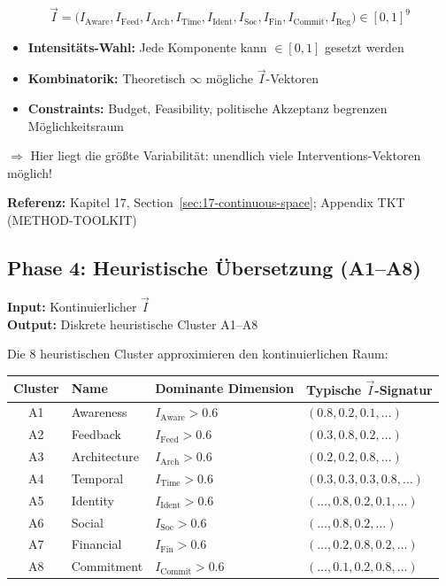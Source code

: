 \begin{equation}
\vec{I} = \bigl(I_{\text{Aware}}, I_{\text{Feed}}, I_{\text{Arch}}, I_{\text{Time}}, I_{\text{Ident}}, I_{\text{Soc}}, I_{\text{Fin}}, I_{\text{Commit}}, I_{\text{Reg}}\bigr) \in [0,1]^9
\end{equation}

\begin{tcolorbox}[colback=orange!5!white, colframe=orange!75!black,
    title=\textbf{Variabilität in Phase 3}]
\begin{itemize}[nosep]
\item \textbf{Intensitäts-Wahl:} Jede Komponente kann $\in [0,1]$ gesetzt werden
\item \textbf{Kombinatorik:} Theoretisch $\infty$ mögliche $\vec{I}$-Vektoren
\item \textbf{Constraints:} Budget, Feasibility, politische Akzeptanz begrenzen Möglichkeitsraum
\end{itemize}
$\Rightarrow$ Hier liegt die größte Variabilität: unendlich viele Interventions-Vektoren möglich!
\end{tcolorbox}

\textbf{Referenz:} Kapitel 17, Section~\ref{sec:17-continuous-space}; Appendix TKT (METHOD-TOOLKIT)

\subsection{Phase 4: Heuristische Übersetzung (A1--A8)}
\label{sec:20-phase4}

\textbf{Input:} Kontinuierlicher $\vec{I}$\\
\textbf{Output:} Diskrete heuristische Cluster A1--A8

Die 8 heuristischen Cluster approximieren den kontinuierlichen Raum:

\begin{center}
\renewcommand{\arraystretch}{1.2}
\footnotesize
\begin{tabular}{@{}clp{3.5cm}p{3.5cm}@{}}
\toprule
\textbf{Cluster} & \textbf{Name} & \textbf{Dominante Dimension} & \textbf{Typische $\vec{I}$-Signatur} \\
\midrule
A1 & Awareness & $I_{\text{Aware}} > 0.6$ & $(0.8, 0.2, 0.1, \ldots)$ \\
A2 & Feedback & $I_{\text{Feed}} > 0.6$ & $(0.3, 0.8, 0.2, \ldots)$ \\
A3 & Architecture & $I_{\text{Arch}} > 0.6$ & $(0.2, 0.2, 0.8, \ldots)$ \\
A4 & Temporal & $I_{\text{Time}} > 0.6$ & $(0.3, 0.3, 0.3, 0.8, \ldots)$ \\
A5 & Identity & $I_{\text{Ident}} > 0.6$ & $(\ldots, 0.8, 0.2, 0.1, \ldots)$ \\
A6 & Social & $I_{\text{Soc}} > 0.6$ & $(\ldots, 0.8, 0.2, \ldots)$ \\
A7 & Financial & $I_{\text{Fin}} > 0.6$ & $(\ldots, 0.2, 0.8, 0.2, \ldots)$ \\
A8 & Commitment & $I_{\text{Commit}} > 0.6$ & $(\ldots, 0.1, 0.2, 0.8, \ldots)$ \\
\bottomrule
\end{tabular}
\end{center}

